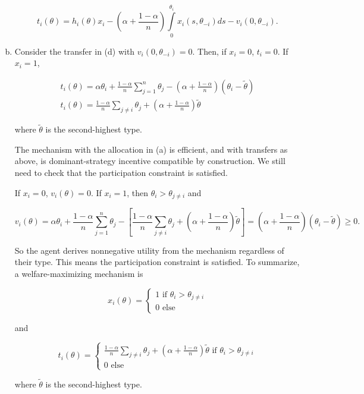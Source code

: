 \documentclass{article}
\begin{document}
\begin{enumerate}[(a)]
	$$t_i(\theta) = h_i(\theta)x_i - \left( \alpha + \frac{1-\alpha}{n} \right) \int \limits_0^{\theta_i} x_i(s, \theta_{-i}) ds- v_i(0, \theta_{-i}).$$

	\item

	Consider the transfer in (d) with $v_i(0, \theta_{-i}) = 0$. Then, if $x_i = 0$, $t_i = 0$. If $x_i = 1$, 

	\begin{gather*}
	t_i(\theta) = \alpha \theta_i + \frac{1-\alpha}{n} \sum_{j = 1}^n \theta_j - \left( \alpha + \frac{1-\alpha}{n} \right) (\theta_i - \tilde{\theta}) \\
	t_i(\theta) = \frac{1-\alpha}{n} \sum \limits_{j\neq i} \theta_j + \left( \alpha + \frac{1-\alpha}{n} \right) \tilde{\theta}
	\end{gather*}

	where $\tilde{\theta}$ is the second-highest type.

	The mechanism with the allocation in (a) is efficient, and with transfers as above, is dominant-strategy incentive compatible by construction. We still need to check that the participation constraint is satisfied.

	If $x_i = 0$, $v_i(\theta) = 0$. If $x_i = 1$, then $\theta_i > \theta_{j\neq i}$ and 

	$$v_i(\theta) = \alpha \theta_i + \frac{1-\alpha}{n} \sum_{j = 1}^n \theta_j - \left[ \frac{1-\alpha}{n} \sum \limits_{j\neq i} \theta_j + \left( \alpha + \frac{1-\alpha}{n} \right) \tilde{\theta} \right] = \left( \alpha + \frac{1-\alpha}{n} \right)(\theta_i - \tilde{\theta}) \geq 0.$$

	So the agent derives nonnegative utility from the mechanism regardless of their type. This means the participation constraint is satisfied. To summarize, a welfare-maximizing mechanism is

	$$x_i(\theta) = \begin{cases}
		1 \text{ if } \theta_i > \theta_{j \neq i} \\
		0 \text{ else}
	\end{cases}$$

	and

	$$t_i(\theta) = \begin{cases}
		\frac{1-\alpha}{n} \sum \limits_{j\neq i} \theta_j + \left( \alpha + \frac{1-\alpha}{n} \right) \tilde{\theta} \text{ if } \theta_i > \theta_{j \neq i} \\
		0 \text{ else}
	\end{cases}$$

	where $\tilde{\theta}$ is the second-highest type.

\end{enumerate}
\end{document}
